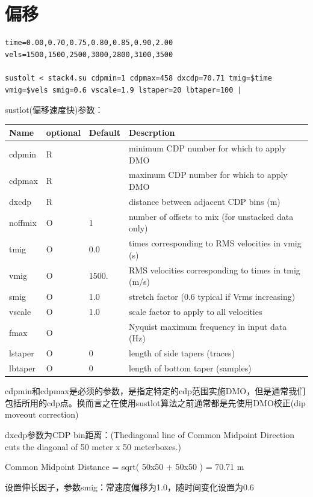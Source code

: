 \section{偏移}
\begin{lstlisting}
time=0.00,0.70,0.75,0.80,0.85,0.90,2.00
vels=1500,1500,2500,3000,2800,3100,3500

sustolt < stack4.su cdpmin=1 cdpmax=458 dxcdp=70.71 tmig=$time vmig=$vels smig=0.6 vscale=1.9 lstaper=20 lbtaper=100 | 
\end{lstlisting}
sustlot(偏移速度快)参数：\\
\begin{tabular}{lllp{}}
	\toprule
	Name  & optional &Default &  Descrption\\
	\midrule
	cdpmin & R & & minimum CDP number for which to apply DMO\\
	cdpmax &  R &  &  maximum CDP number for which to apply DMO\\
	dxcdp  &  R &  &  distance between adjacent CDP bins (m)\\
	noffmix & O & 1 & number of offsets to mix (for unstacked data only)\\
	tmig & O & 0.0 & times corresponding to RMS velocities in vmig (s)\\
	vmig & O & 1500. & RMS velocities corresponding to times in tmig (m/s)\\
	smig  & O & 1.0 & stretch factor (0.6 typical if Vrms increasing)\\
	vscale & O & 1.0 & scale factor to apply to all velocities  \\  	
	fmax & O & & Nyquist maximum frequency in input data (Hz)\\
	lstaper & O & 0 & length of side tapers (traces)\\
	lbtaper &  O & 0  & length of bottom taper (samples)\\
	\bottomrule
\end{tabular}\par
cdpmin和cdpmax是必须的参数，是指定特定的cdp范围实施DMO，但是通常我们包括所用的cdp点。换而言之在使用sustlot算法之前通常都是先使用DMO校正(dip moveout correction)\par
dxcdp参数为CDP bin距离：(Thediagonal line of Common Midpoint Direction cuts the diagonal of 50 meter x 50 meterboxes.)\par
Common Midpoint Distance = sqrt( 50x50 + 50x50 ) = 70.71 m\par
设置伸长因子，参数smig：常速度偏移为1.0，随时间变化设置为0.6\par
